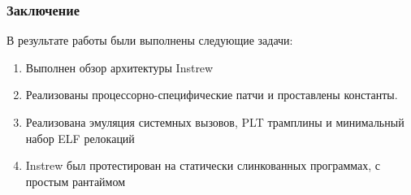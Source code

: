 \documentclass{beamer}
\begin{document}
\begin{frame}
  \frametitle{Заключение}
  В результате работы были выполнены следующие задачи:
  \vspace{8pt}
  \begin{enumerate}
    \item Выполнен обзор архитектуры Instrew
    \item Реализованы процессорно-специфические патчи и проставлены константы.
    \item Реализована эмуляция системных вызовов, PLT трамплины и минимальный набор ELF релокаций
    \item Instrew был протестирован на статически слинкованных программах, с простым рантаймом
  \end{enumerate}
  \vspace{8pt}

\end{frame}

\appendix



\end{document}
